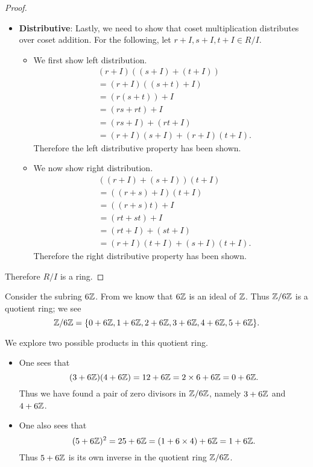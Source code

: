 \begin{proof}
\begin{itemize}
\begin{itemize}
        \end{itemize}
        \item \textbf{Distributive}: Lastly, we need to show that coset multiplication distributes over coset addition. For the following, let $r+I, s+I, t+I \in R/I$.
        \begin{itemize}
            \item We first show left distribution.
            \begin{align*}
                &(r+I)((s+I)+(t+I))\\
                &= (r+I)((s+t)+I)\\
                &= (r(s+t))+I\\
                &= (rs+rt)+I\\
                &= (rs+I) + (rt+I)\\
                &=(r+I)(s+I) + (r+I)(t+I).
            \end{align*}
            Therefore the left distributive property has been shown.

            \item We now show right distribution.
            \begin{align*}
                &((r+I)+(s+I))(t+I)\\
                &= ((r+s)+I)(t+I)\\
                &= ((r+s)t)+I\\
                &= (rt+st)+I\\
                &= (rt+I) + (st+I)\\
                &= (r+I)(t+I) + (s+I)(t+I).
            \end{align*}
            Therefore the right distributive property has been shown.
        \end{itemize}
    \end{itemize}
    Therefore $R/I$ is a ring.
\end{proof}

\begin{example}
    Consider the subring $6\mathbb{Z}$. From  we know that $6\mathbb{Z}$ is an ideal of $\mathbb{Z}$. Thus $\mathbb{Z}/6\mathbb{Z}$ is a quotient ring; we see
    \[
        \mathbb{Z}/6\mathbb{Z} = \{0 + 6\mathbb{Z}, 1+6\mathbb{Z}, 2+6\mathbb{Z}, 3+6\mathbb{Z}, 4+6\mathbb{Z}, 5+6\mathbb{Z}\}.
    \]

    We explore two possible products in this quotient ring.
    \begin{itemize}
        \item One sees that
        \[
            (3+6\mathbb{Z})(4+6\mathbb{Z}) = 12+6\mathbb{Z} = 2\times 6 + 6\mathbb{Z} = 0 + 6\mathbb{Z}.
        \]
        Thus we have found a pair of zero divisors in $\mathbb{Z}/6\mathbb{Z}$, namely $3+6\mathbb{Z}$ and $4+6\mathbb{Z}$.

        \item One also sees that
        \[
            (5+6\mathbb{Z})^2 = 25+6\mathbb{Z} = (1 + 6\times4) + 6\mathbb{Z} = 1 + 6\mathbb{Z}.
        \]
        Thus $5+6\mathbb{Z}$ is its own inverse in the quotient ring $\mathbb{Z}/6\mathbb{Z}$.
    \end{itemize}
\end{example}

